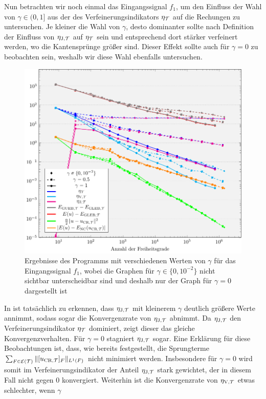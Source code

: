 Nun betrachten wir noch einmal das Eingangssignal $f_1$, um den Einfluss der
Wahl von $\gamma\in(0,1]$ aus der  des
Verfeinerungsindikators $\eta_{\mathcal{T}}$ auf die Rechungen zu untersuchen.
Je kleiner die Wahl von $\gamma$, desto dominanter sollte nach Definition der
Einfluss von $\eta_{\textup{J}, \mathcal{T}}$ auf $\eta_{\mathcal{T}}$ sein und entsprechend dort stärker 
verfeinert werden, wo die Kantensprünge größer sind.
Dieser Effekt sollte auch für $\gamma=0$ zu beobachten sein, weshalb wir
diese Wahl ebenfalls untersuchen.
\begin{figure}[p]
  \centering
  \includegraphics[width=.8\linewidth]
    {pictures/chapExperiments/secExactSol/parGamma/conv.pdf}
  \caption{Ergebnisse des Programms mit verschiedenen Werten von $\gamma$ für
    das Eingangssignal $f_1$, wobei die Graphen für $\gamma \in\{0,10^{-2}\}$
    nicht sichtbar unterscheidbar sind und deshalb nur der Graph für $\gamma=0$
    dargestellt ist}
  \label{fig:parGammaConvergence}
\end{figure}
In  ist tatsächlich zu erkennen, dass
$\eta_{\textup{J}, \mathcal{T}}$ mit kleinerem $\gamma$ deutlich größere Werte annimmt, sodass
sogar die Konvergenzrate von $\eta_{\textup{J}, \mathcal{T}}$ abnimmt. 
Da $\eta_{\textup{J}, \mathcal{T}}$ den Verfeinerungsindikator $\eta_{\mathcal{T}}$ dominiert, zeigt dieser das
gleiche Konvergenzverhalten.
Für $\gamma=0$ stagniert $\eta_{\textup{J}, \mathcal{T}}$ sogar.
Eine Erklärung für diese Beobachtungen ist, dass, wie bereits
festgestellt, die Sprungterme $\sum_{F\in\mathcal{E}(\mathcal{T})}\Vert
[u_{\textup{CR}, \mathcal{T}}]_F\Vert_{L^1(F)}$ nicht minimiert werden.
Insbesondere für $\gamma=0$ wird somit im Verfeinerungsindikator der Anteil
$\eta_{\textup{J}, \mathcal{T}}$ stark gewichtet, der in diesem Fall nicht gegen 0 konvergiert.  
Weiterhin ist die Konvergenzrate von $\eta_{\textup{V}, \mathcal{T}}$ etwas schlechter, wenn $\gamma$
